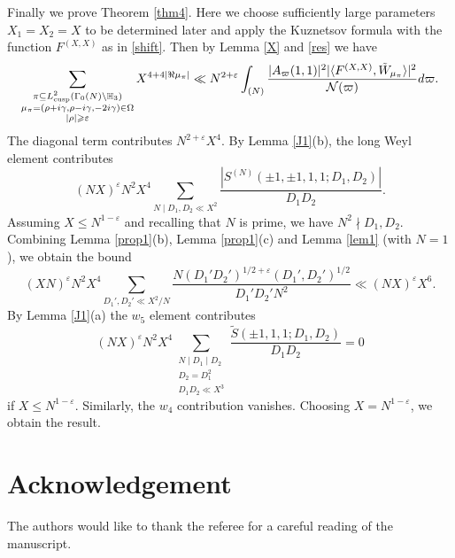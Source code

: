 \documentclass[11pt]{amsart}
\theoremstyle{plain}
\numberwithin{equation}{section}
\theoremstyle{definition}
\renewcommand{\geq}{\geqslant}
\renewcommand{\leq}{\leqslant}
\begin{document}
Finally we prove Theorem \ref{thm4}. Here we choose sufficiently large parameters $X_1=  X_2 = X$ to be determined later and apply the Kuznetsov formula with the function $F^{(X, X)}$ as in \eqref{shift}. Then by Lemma \ref{X} and \eqref{res} we have
$$\sum_{\substack{\pi \subseteq L_{\text{cusp}}^2(\Gamma_0(N) \backslash \Bbb{H}_3)\\ \mu_{\pi}  = (\rho + i\gamma, \rho - i\gamma, - 2 i \gamma) \in \Omega\\ |\rho| \geq \varepsilon}} X^{4 +4 |\Re\mu_{\pi}|} \ll N^{2+\varepsilon} \int_{(N)} \frac{|A_{\varpi}(1, 1)|^2 |\langle F^{(X, X)}, \tilde{W}_{\mu_{\pi}}\rangle|^2}{\mathcal{N}(\varpi)} d\varpi.$$
The diagonal term contributes $N^{2+\varepsilon}X^4$. By Lemma \ref{J1}(b), the long Weyl element contributes
$$(NX)^{\varepsilon}N^{2} X^4 \sum_{N \mid D_1, D_2 \ll X^2} \frac{|S^{(N)}(\pm 1, \pm 1,  1,  1; D_1, D_2)|}{D_1D_2}.$$
Assuming $X \leq N^{1-\varepsilon}$ and recalling that $N$ is prime, we have $N^2 \nmid D_1, D_2$. Combining Lemma \ref{prop1}(b), Lemma \ref{prop1}(c) and Lemma \ref{lem1} (with $N = 1$), we obtain the bound
$$(XN)^{\varepsilon} N^{2 } X^4 \sum_{D_1', D_2' \ll  X^2/N} \frac{N(D_1'D_2')^{1/2+\varepsilon}(D_1', D_2')^{1/2}}{D_1'D_2'N^2} \ll (NX)^{\varepsilon} X^6.$$
By Lemma \ref{J1}(a) the $w_5$ element contributes
$$(NX)^{\varepsilon} N^{2 } X^4 \sum_{\substack{N \mid D_1\mid D_2\\ D_2 = D_1^2\\ D_1D_2 \ll X^3}}\frac{\tilde{S}(\pm 1,  1,  1; D_1, D_2)}{D_1D_2} = 0$$
if $X \leq N^{1-\varepsilon}$. Similarly, the $w_4$ contribution vanishes. Choosing $X = N^{1-\varepsilon}$, we obtain the result. 


\section*{Acknowledgement} The authors would like to thank the referee for a careful reading of the manuscript.
\end{document}

